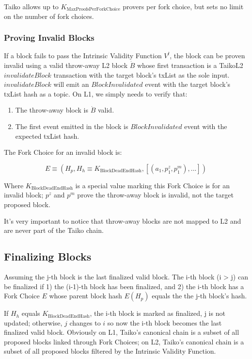 \documentclass[9pt,oneside]{amsart}
\begin{document}
\begin{multicols}{2}
Taiko allows up to $K_{\mathrm{MaxProofsPerForkChoice}}$ provers per fork choice, but sets no limit on the number of fork choices.

\subsubsection{Proving Invalid Blocks} \label{sec:provinginvaid}

If a block fails to pass the Intrinsic Validity Function $V^l$, the block can be proven invalid using a valid throw-away L2 block $\dot{B}$ whose first transaction is a TaikoL2 $invalidateBlock$ transaction with the target block's txList as the sole input. $invalidateBlock$ will emit an $BlockInvalidated$ event with the target block's txList hash as a topic. On L1, we simply needs to verify that:

\begin{enumerate}
\item The throw-away block is $\dot{B}$ valid.
\item The first event emitted in the block is $BlockInvalidated$ event with the expected txList hash. 
\end{enumerate}

The Fork Choice for an invalid block is:

\begin{equation}
E \equiv (H_p, H_h \equiv K_{\mathrm{BlockDeadEndHash}}, [(a_1, p^{z}_1, p^{m}_1),...])
\end{equation}

Where $K_{\mathrm{BlockDeadEndHash}}$ is a special value marking this Fork Choice is for an invalid block; $p^{z}$ and  $p^{m}$ prove the throw-away block is invalid, not the target proposed block.

It's very important to notice that throw-away blocks are not mapped to L2 and are never part of the Taiko chain.

\subsection{Finalizing Blocks}\label{sec:finalizing}

Assuming the j-th block is the last finalized valid block. The i-th block (i > j) can be finalized if 1) the (i-1)-th block has been finalized, and 2) the i-th block has a Fork Choice $E$ whose parent block hash $E(H_p)$ equals the the j-th block's hash.

If $H_h$ equals $K_{\mathrm{BlockDeadEndHash}}$, the i-th block is marked as finalized, j is not updated; otherwise,  $j$ changes to $i$ so now the i-th block becomes the last finalized valid block. Obviously on L1, Taiko's canonical chain is a subset of all proposed blocks linked through Fork Choices; on L2, Taiko's canonical chain is a subset of all proposed blocks filtered by the Intrinsic Validity Function.


\end{multicols}
\end{document}
